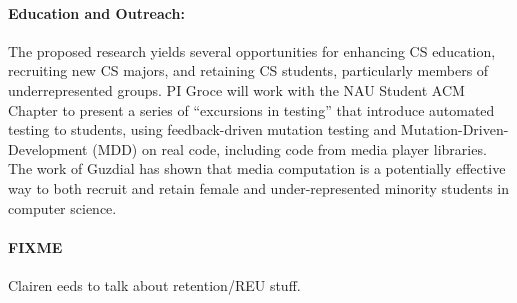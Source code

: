 \paragraph{Education and Outreach:}
The proposed research yields several opportunities for enhancing CS
education, recruiting new CS majors, and retaining CS students,
particularly members of underrepresented groups.  
PI Groce will work with the NAU Student ACM Chapter to present a
series of ``excursions in testing'' that introduce automated testing
to students, using feedback-driven mutation testing and Mutation-Driven-Development (MDD) on real code, including code from
media player libraries.  The work of Guzdial
\cite{Guzdial} has shown that media computation is a
potentially effective way to both recruit and retain female and
under-represented minority students in computer science.

\paragraph{FIXME} Clairen eeds to talk about retention/REU stuff. 